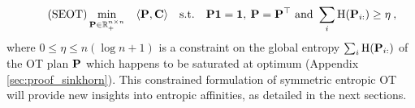 \begin{equation}
\tag{SEOT}
\label{eq:entropy_constrained_OT}
\min_{\mathbf{P} \in \mathbb{R}_{+}^{n \times n}} \quad \langle \mathbf{P}, \mathbf{C} \rangle \quad \text{s.t.} \quad \mathbf{P} \bm{1} = \bm{1}, \: \mathbf{P} = \mathbf{P}^\top \text{ and } \sum_i \operatorname{H}(\mathbf{P}_{i:}) \geq \eta \:,
\end{equation}
where $0 \leq \eta \leq n (\log n + 1)$ is a constraint on the global entropy $\sum_i \operatorname{H}(\mathbf{P}_{i:})$ of the OT plan $\mathbf{P}$ which happens to be saturated at optimum (Appendix \ref{sec:proof_sinkhorn}). This constrained formulation of symmetric entropic OT will provide new insights into entropic affinities, as detailed in the next sections.






